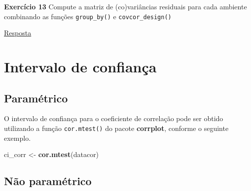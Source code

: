 \documentclass[
]{book}
\newenvironment{Shaded}{\begin{snugshade}}{\end{snugshade}}
\newcommand{\CommentTok}[1]{\textcolor[rgb]{0.56,0.35,0.01}{\textit{#1}}}
\newcommand{\DataTypeTok}[1]{\textcolor[rgb]{0.13,0.29,0.53}{#1}}
\newcommand{\KeywordTok}[1]{\textcolor[rgb]{0.13,0.29,0.53}{\textbf{#1}}}
\newcommand{\NormalTok}[1]{#1}
\newcommand{\OperatorTok}[1]{\textcolor[rgb]{0.81,0.36,0.00}{\textbf{#1}}}
\newcommand{\StringTok}[1]{\textcolor[rgb]{0.31,0.60,0.02}{#1}}
\begin{document}
\begin{Shaded}
\end{Shaded}

\begin{tarefa}
\textbf{Exercício 13}
Compute a matriz de (co)variâncias residuais para cada ambiente combinando as funções \texttt{group\_by()} e \texttt{covcor\_design()}
\end{tarefa}
\protect\hyperlink{exerc13}{Resposta}

\hypertarget{intervalo-de-confianuxe7a}{%
\section{Intervalo de confiança}\label{intervalo-de-confianuxe7a}}

\hypertarget{paramuxe9trico}{%
\subsection{Paramétrico}\label{paramuxe9trico}}

O intervalo de confiança para o coeficiente de correlação pode ser obtido utilizando a função \texttt{cor.mtest()} do pacote \textbf{corrplot}, conforme o seguinte exemplo.

\begin{Shaded}
\begin{Highlighting}[]
\NormalTok{ci_corr <-}\StringTok{ }\KeywordTok{cor.mtest}\NormalTok{(datacor)}
\end{Highlighting}
\end{Shaded}

\hypertarget{nuxe3o-paramuxe9trico}{%
\subsection{Não paramétrico}\label{nuxe3o-paramuxe9trico}}
\end{document}
